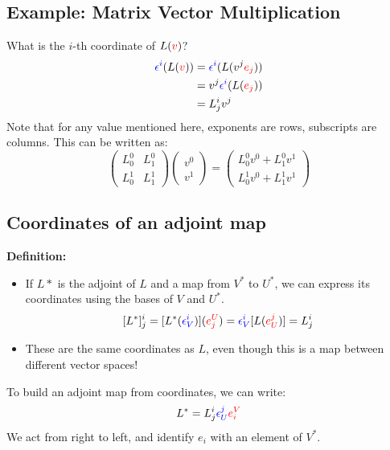 \documentclass[10pt]{article}
\begin{document}
\subsection*{Example: Matrix Vector Multiplication}
What is the $i$-th coordinate of $L(\textcolor{red}{v})$?
\begin{align*}
    \textcolor{blue}{\epsilon^i}(L(\textcolor{red}{v})) &= \textcolor{blue}{\epsilon^i}(L(v^j\textcolor{red}{e_j}))\\
    &= v^j \textcolor{blue}{\epsilon^i}(L(\textcolor{red}{e_j}))\\
    &= L_j^i v^j
\end{align*}
Note that for any value mentioned here, exponents are rows, subscripts are columns.
This can be written as:
\[\begin{pmatrix} L_0^0 & L_1^0 \\ L_0^1 & L_1^1\end{pmatrix} \begin{pmatrix} v^0 \\ v^1 \end{pmatrix} = \begin{pmatrix}L_0^0 v^0 + L_1^0 v^1 \\ L_0^1 v^0 + L_1^1 v^1\end{pmatrix}\]

\subsection*{Coordinates of an adjoint map}
\textbf{Definition:}
\begin{itemize}
    \item If $L*$ is the adjoint of $L$ and a map from $V^*$ to $U^*$, we can express its coordinates using the bases of $V$ and $U^*$.
    \[[L^*]_j^i = [L^*(\textcolor{blue}{\epsilon_V^i})](\textcolor{red}{e_j^U}) = \textcolor{blue}{\epsilon_V^i}[L(\textcolor{red}{e_U^j})] = L_j^i\]
    \item These are the same coordinates as $L$, even though this is a map between different vector spaces!
\end{itemize}
To build an adjoint map from coordinates, we can write:
\[L^* = L_j^i \textcolor{blue}{\epsilon_U^j} \textcolor{red}{e_i^V} \]
We act from right to left, and identify $e_i$ with an element of $V^*$.
\end{document}
